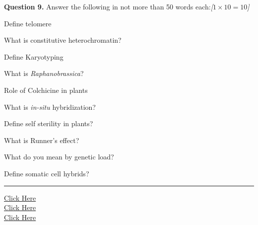 \documentclass[11pt,a4paper]{article}
\newcommand{\pts}[1]{\hfill   \textit{[#1]}}
\begin{document}
\medskip


\noindent   \textbf{Question 9.} Answer the following in not more than 50 words each:\pts{$1  \times 10 = 10$}

\begin{parts}
  \item Define telomere
  \item What is constitutive heterochromatin?
  \item Define Karyotyping
  \item What is   \textit{Raphanobrassica}?
  \item Role of Colchicine in plants
  \item What is   \textit{in-situ} hybridization?
  \item Define self sterility in plants?
  \item What is Runner's effect?
  \item What do you mean by genetic load?
  \item Define somatic cell hybrids?
\end{parts}

\vfill
\rule{\linewidth}{0.4pt}

\begin{center}\small
\href{https://bhu-exam.vercel.app/}{Click Here}\\[4pt]\href{https://me-aryan.vercel.app/}{Click Here}\\[4pt]\href{https://quashan-me.vercel.app/}{Click Here}
\end{center}
\end{document}
